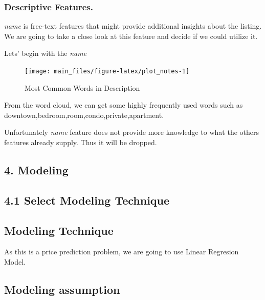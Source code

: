 \hypertarget{descriptive-features.}{%
\subsubsection{Descriptive Features.}\label{descriptive-features.}}

\emph{name } is free-text features that might provide additional
insights about the listing. We are going to take a close look at this
feature and decide if we could utilize it.

Lets' begin with the \emph{name}

\begin{Schunk}
\begin{figure}[H]

{\centering \texttt{[image: main\_files/figure-latex/plot\_notes-1]} 

}

\caption[Most Common Words in Description]{Most Common Words in Description}\label{fig:plot_notes}
\end{figure}
\end{Schunk}

From the word cloud, we can get some highly frequently used words such
as downtown,bedroom,room,condo,private,apartment.

Unfortunately \emph{name} feature does not provide more knowledge to
what the others features already supply. Thus it will be dropped.

\hypertarget{modeling}{%
\subsection{4. Modeling}\label{modeling}}

\hypertarget{select-modeling-technique}{%
\subsection{4.1 Select Modeling
Technique}\label{select-modeling-technique}}

\hypertarget{modeling-technique}{%
\subsection{Modeling Technique}\label{modeling-technique}}

As this is a price prediction problem, we are going to use Linear
Regresion Model.

\hypertarget{modeling-assumption}{%
\subsection{Modeling assumption}\label{modeling-assumption}}

